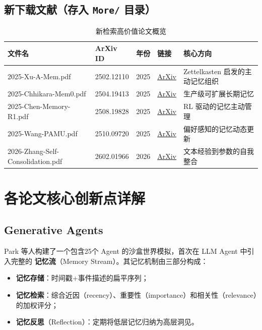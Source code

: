 \documentclass[11pt,a4paper]{article}
\begin{document}
\subsection{新下载文献（存入 \texttt{More/} 目录）}

\begin{table}[h!]
\centering
\caption{新检索高价值论文概览}
\label{tab:new}
\renewcommand{\arraystretch}{1.3}
\begin{tabular}{lllll}
\toprule
\textbf{文件名} & \textbf{ArXiv ID} & \textbf{年份} & \textbf{链接} & \textbf{核心方向} \\
\midrule
2025-Xu-A-Mem.pdf & 2502.12110 & 2025 & \href{https://arxiv.org/abs/2502.12110}{ArXiv} & Zettelkasten 启发的主动记忆组织 \\
2025-Chhikara-Mem0.pdf & 2504.19413 & 2025 & \href{https://arxiv.org/abs/2504.19413}{ArXiv} & 生产级可扩展长期记忆 \\
2025-Chen-Memory-R1.pdf & 2508.19828 & 2025 & \href{https://arxiv.org/abs/2508.19828}{ArXiv} & RL 驱动的记忆主动管理 \\
2025-Wang-PAMU.pdf & 2510.09720 & 2025 & \href{https://arxiv.org/abs/2510.09720}{ArXiv} & 偏好感知的记忆动态更新 \\
2026-Zhang-Self-Consolidation.pdf & 2602.01966 & 2026 & \href{https://arxiv.org/abs/2602.01966}{ArXiv} & 文本经验到参数的自我整合 \\
\bottomrule
\end{tabular}
\end{table}

\section{各论文核心创新点详解}

\subsection{Generative Agents}

Park 等人构建了一个包含25个 Agent 的沙盒世界模拟，首次在 LLM Agent 中引入完整的
\textbf{记忆流}（Memory Stream）。其记忆机制由三部分构成：
\begin{itemize}
  \item \textbf{记忆存储}：时间戳+事件描述的扁平序列；
  \item \textbf{记忆检索}：综合近因（recency）、重要性（importance）和相关性（relevance）的加权评分；
  \item \textbf{记忆反思}（Reflection）：定期将低层记忆归纳为高层洞见。
\end{itemize}
\end{document}
